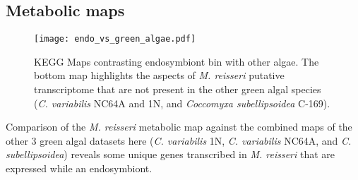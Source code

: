 
\subsection{Metabolic maps}


%
%
%


\begin{figure}
    \texttt{[image: endo\_vs\_green\_algae.pdf]}
    \caption[KEGG maps of endosymbiont bin compared with other algae]{
    KEGG Maps contrasting endosymbiont bin with other algae. The bottom map highlights
the aspects of \textit{M. reisseri} putative transcriptome that are not present in
the other green algal species (\textit{C. variabilis} NC64A and 1N, 
and \textit{Coccomyxa subellipsoidea} C-169).}
\label{fig:algae_comp}
\end{figure}

Comparison of the \textit{M. reisseri} metabolic map against the combined
maps of the other 3 green algal datasets here (\textit{C. variabilis} 1N, 
\textit{C. variabilis} NC64A, and \textit{C. subellipsoidea}) reveals
some unique genes transcribed in \textit{M. reisseri} that are expressed while 
an endosymbiont.  

